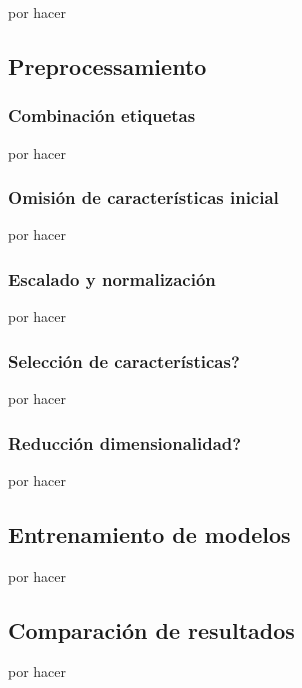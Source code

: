 por hacer

\subsection{Preprocessamiento}

\subsubsection{Combinación etiquetas}
por hacer

\subsubsection{Omisión de características inicial}
por hacer

\subsubsection{Escalado y normalización}
por hacer

\subsubsection{Selección de características?}
por hacer

\subsubsection{Reducción dimensionalidad?}
por hacer

\subsection{Entrenamiento de modelos}

por hacer

\subsection{Comparación de resultados}

por hacer

